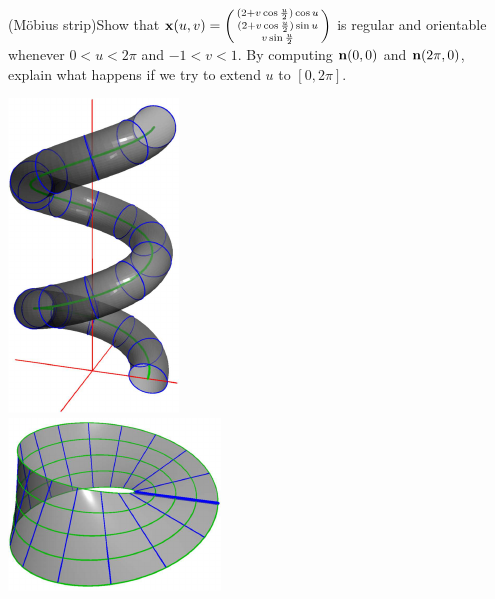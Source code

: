 \begin{exercises}
\begin{enumerate}
\begin{minipage}[t]{0.75\linewidth}
				
			\item\label{exs:mobius} (Möbius strip)\lstsp Show that ${\mathbf{x}}(u,v)=\left(\begin{smallmatrix}(2+v\cos\frac u2)\cos u\\(2+v\cos\frac u2)\sin u\\v\sin\frac u2\end{smallmatrix}\right)$ is regular and orientable whenever $0<u<2\pi$ and $-1<v<1$. By computing ${\mathbf{n}}(0,0)$ and ${\mathbf{n}}(2\pi,0)$, explain what happens if we try to extend $u$ to $[0,2\pi]$.
	  \end{minipage}
	  \hfill
	  \begin{minipage}[t]{0.23\linewidth}\vspace{-15pt}
	  	\flushright
			\href{http://www.math.uci.edu/~ndonalds/math162a/surfaces-helixtube.html}{\includegraphics{surfaces-helixtube}}\\
			\href{http://www.math.uci.edu/~ndonalds/math162a/surfaces-mobius.html}{\includegraphics{surfaces-mobius}}
	  \end{minipage}
	  


	
	

\end{enumerate}
\end{exercises}
